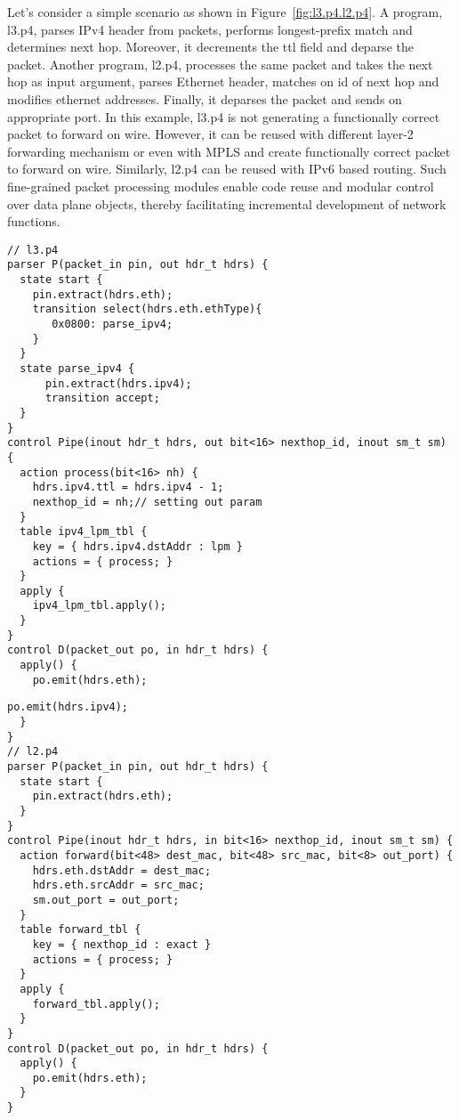Let's consider a simple scenario as shown in Figure~\ref{fig:l3.p4.l2.p4}. A program, l3.p4, parses IPv4 header from packets, performs longest-prefix match and determines next hop. 
Moreover, it decrements the ttl field and deparse the packet. 
Another program, l2.p4, processes the same packet and takes the next hop as input argument, parses Ethernet header, matches on id of next hop and modifies ethernet addresses.
Finally, it deparses the packet and sends on appropriate port.
In this example, l3.p4 is not generating a functionally correct packet to forward on wire. 
However, it can be reused with different layer-2 forwarding mechanism or even with MPLS and create functionally correct packet to forward on wire. 
Similarly, l2.p4 can be reused with IPv6 based routing.
Such fine-grained packet processing modules enable code reuse and modular control over data plane objects, thereby facilitating incremental development of network functions. 

\begin{figure*}
\noindent \begin{minipage}[t]{.48\textwidth}
\begin{lstlisting}[frame=none]
// l3.p4
parser P(packet_in pin, out hdr_t hdrs) {
  state start {
    pin.extract(hdrs.eth);
    transition select(hdrs.eth.ethType){
       0x0800: parse_ipv4;
    }
  }
  state parse_ipv4 {
      pin.extract(hdrs.ipv4);
      transition accept;
  }
}
control Pipe(inout hdr_t hdrs, out bit<16> nexthop_id, inout sm_t sm) {
  action process(bit<16> nh) {
    hdrs.ipv4.ttl = hdrs.ipv4 - 1;
    nexthop_id = nh;// setting out param
  }
  table ipv4_lpm_tbl {
    key = { hdrs.ipv4.dstAddr : lpm } 
    actions = { process; }
  }
  apply {
    ipv4_lpm_tbl.apply();
  }
}
control D(packet_out po, in hdr_t hdrs) {
  apply() {
    po.emit(hdrs.eth);
\end{lstlisting}
\end{minipage}
\hfill\begin{minipage}[t]{.48\textwidth}
\begin{lstlisting}[frame=none]
    po.emit(hdrs.ipv4);
  }
}
// l2.p4
parser P(packet_in pin, out hdr_t hdrs) {
  state start {
    pin.extract(hdrs.eth);
  }
}
control Pipe(inout hdr_t hdrs, in bit<16> nexthop_id, inout sm_t sm) {
  action forward(bit<48> dest_mac, bit<48> src_mac, bit<8> out_port) {
    hdrs.eth.dstAddr = dest_mac;
    hdrs.eth.srcAddr = src_mac;
    sm.out_port = out_port;    
  }
  table forward_tbl {
    key = { nexthop_id : exact } 
    actions = { process; }
  }
  apply {
    forward_tbl.apply();
  }
}
control D(packet_out po, in hdr_t hdrs) {
  apply() {
    po.emit(hdrs.eth);
  }
}
\end{lstlisting}
\end{minipage}
\caption{Fine-grained packet processing modules - l3.p4  and l2.p4}
\label{fig:l3.p4.l2.p4}
\end{figure*}


